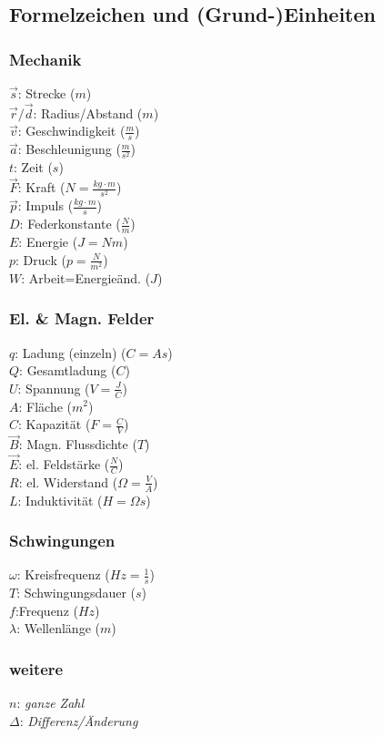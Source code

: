 \documentclass[12pt,a4paper,oneside]{article}
\begin{document}
\subsection*{Formelzeichen und (Grund-)Einheiten}
\begin{multicols}{3}
 \subsubsection*{Mechanik}
 $\vec{s}$: Strecke ($m$) \\
 $\vec{r}/\vec{d}$: Radius/Abstand ($m$)\\
 $\vec{v}$: Geschwindigkeit ($\frac{m}{s}$) \\
 $\vec{a}$: Beschleunigung ($\frac{m}{s^2}$) \\
 $t$: Zeit ($s$) \\
 $\vec{F}$: Kraft ($N=\frac{kg \cdot m}{s^2}$) \\
 $\vec{p}$: Impuls ($\frac{kg \cdot m}{s}$) \\
 $D$: Federkonstante ($\frac{N}{m}$) \\
 $E$: Energie ($J=Nm$) \\
 $p$: Druck ($p=\frac{N}{m^2}$) \\
 $W$: Arbeit=Energieänd. ($J$)
 \subsubsection*{El. \& Magn. Felder}
 $q$: Ladung (einzeln) ($C=As$) \\
 $Q$: Gesamtladung ($C$) \\
 $U$: Spannung ($V=\frac{J}{C}$) \\
 $A$: Fläche ($m^2$) \\
 $C$: Kapazität ($F=\frac{C}{V}$) \\
 $\vec{B}$: Magn. Flussdichte ($T$) \\
 $\vec{E}$: el. Feldstärke ($\frac{N}{C}$) \\
 $R$: el. Widerstand ($\Omega=\frac{V}{A}$) \\
 $L$: Induktivität ($H = \Omega s$) \\
 \subsubsection*{Schwingungen}
 $\omega$: Kreisfrequenz ($Hz = \frac{1}{s}$) \\
 $T$: Schwingungsdauer ($s$) \\
 $f$:Frequenz ($Hz$) \\
 $\lambda$: Wellenlänge ($m$) \\
 \subsubsection*{weitere}
 $n$: \textit{ganze Zahl}\\
 $\Delta$: \textit{Differenz/Änderung}\\
\end{multicols}
\end{document}

